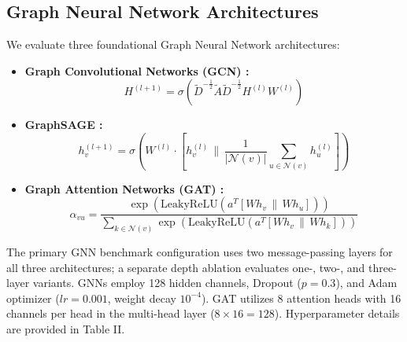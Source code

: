 \documentclass[conference]{IEEEtran}
\begin{document}
\subsection{Graph Neural Network Architectures}
We evaluate three foundational Graph Neural Network architectures:
\begin{itemize}
    \item \textbf{Graph Convolutional Networks (GCN) \cite{kipf2017semi}:}
    \begin{equation}
    H^{(l+1)} = \sigma\left( \tilde{D}^{-\frac{1}{2}} \tilde{A} \tilde{D}^{-\frac{1}{2}} H^{(l)} W^{(l)} \right)
    \label{eq:gcn}
    \end{equation}
    \item \textbf{GraphSAGE \cite{hamilton2017inductive}:}
    \begin{equation}
    h_v^{(l+1)} = \sigma\left( W^{(l)} \cdot \left[ h_v^{(l)} \,\|\, \frac{1}{|\mathcal{N}(v)|} \sum_{u \in \mathcal{N}(v)} h_u^{(l)} \right] \right)
    \label{eq:sage}
    \end{equation}
    \item \textbf{Graph Attention Networks (GAT) \cite{velickovic2018graph}:}
    \begin{equation}
    \alpha_{vu} = \frac{\exp\left(\text{LeakyReLU}\left(a^T [W h_v \,\|\, W h_u]\right)\right)}{\sum_{k \in \mathcal{N}(v)} \exp\left(\text{LeakyReLU}\left(a^T [W h_v \,\|\, W h_k]\right)\right)}
    \label{eq:gat}
    \end{equation}
\end{itemize}
The primary GNN benchmark configuration uses two message-passing layers for all three architectures; a separate depth ablation evaluates one-, two-, and three-layer variants. GNNs employ 128 hidden channels, Dropout ($p=0.3$), and Adam optimizer ($lr=0.001$, weight decay $10^{-4}$). GAT utilizes 8 attention heads with 16 channels per head in the multi-head layer ($8 \times 16 = 128$). Hyperparameter details are provided in Table II.

\begin{table}[htbp]
\centering
\caption{Model Architecture and Hyperparameter Specification}
\label{tab:model_spec}
{\small
{}
}
\end{table}
\end{document}
